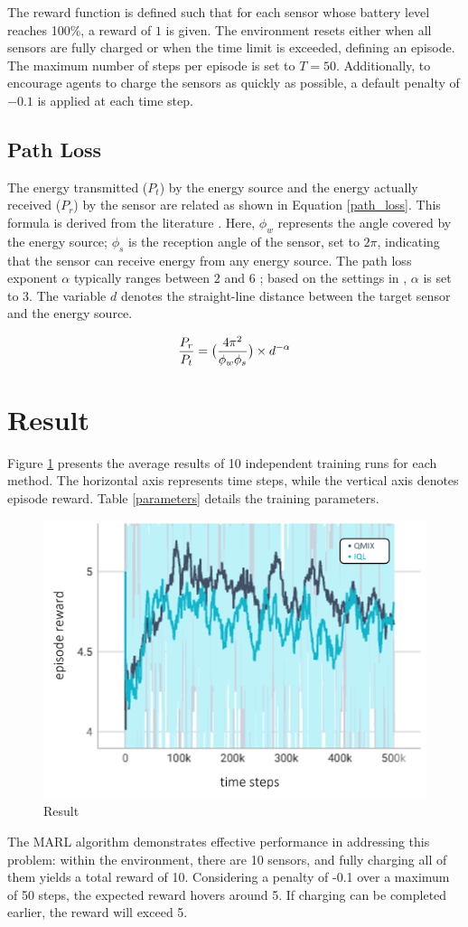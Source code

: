 \documentclass{article}
\begin{document}
The reward function is defined such that for each sensor whose battery level reaches 100\%, a reward of $1$ is given. The environment resets either when all sensors are fully charged or when the time limit is exceeded, defining an episode. The maximum number of steps per episode is set to $T=50$. Additionally, to encourage agents to charge the sensors as quickly as possible, a default penalty of $-0.1$ is applied at each time step.


\subsection{Path Loss}

The energy transmitted ($P_t$) by the energy source and the energy actually received ($P_r$) by the sensor are related as shown in Equation \ref{path_loss}. This formula is derived from the literature \cite{wang2017transmission}. Here, $\phi_w$ represents the angle covered by the energy source; $\phi_s$ is the reception angle of the sensor, set to $2\pi$, indicating that the sensor can receive energy from any energy source. The path loss exponent $\alpha$ typically ranges between $2$ and $6$ \cite{rappaport2024wireless}; based on the settings in \cite{zhang2015optimal}, $\alpha$ is set to $3$. The variable $d$ denotes the straight-line distance between the target sensor and the energy source.

\begin{equation}\label{path_loss}
{P_r\over P_t}=\big(\normalsize {4\pi^2\over \phi_w\phi_s}\big)\times d^{-\alpha}
\end{equation}

\section{Result}
Figure \ref{result} presents the average results of 10 independent training runs for each method. The horizontal axis represents time steps, while the vertical axis denotes episode reward. Table \ref{parameters} details the training parameters.
\begin{figure}[htb]
	\centerline{\includegraphics[width=0.6\linewidth]{result.png}}
	\caption{Result}\label{result}
\end{figure}
The MARL algorithm demonstrates effective performance in addressing this problem: within the environment, there are 10 sensors, and fully charging all of them yields a total reward of 10. Considering a penalty of -0.1 over a maximum of 50 steps, the expected reward hovers around 5. If charging can be completed earlier, the reward will exceed 5.
\end{document}

